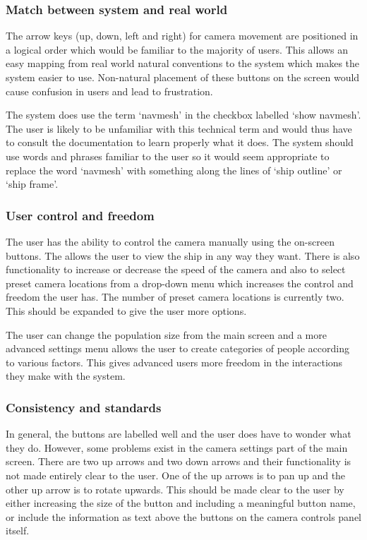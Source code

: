 \subsubsection{Match between system and real world}
The arrow keys (up, down, left and right) for camera movement are positioned in a logical order which would be familiar to the majority of users. This allows an easy mapping from real world natural conventions to the system which makes the system easier to use. Non-natural placement of these buttons on the screen would cause confusion in users and lead to frustration.

The system does use the term ‘navmesh’ in the checkbox labelled ‘show navmesh’. The user is likely to be unfamiliar with this technical term and would thus have to consult the documentation to learn properly what it does. The system should use words and phrases familiar to the user so it would seem appropriate to replace the word ‘navmesh’ with something along the lines of ‘ship outline’ or ‘ship frame’.

\subsubsection{User control and freedom}
The user has the ability to control the camera manually using the on-screen buttons. The allows the user to view the ship in any way they want. There is also functionality to increase or decrease the speed of the camera and also to select preset camera locations from a drop-down menu which increases the control and freedom the user has. The number of preset camera locations is currently two. This should be expanded to give the user more options.

The user can change the population size from the main screen and a more advanced settings menu allows the user to create categories of people according to various factors. This gives advanced users more freedom in the interactions they make with the system.

\subsubsection{Consistency and standards}
In general, the buttons are labelled well and the user does have to wonder what they do. However, some problems exist in the camera settings part of the main screen. There are two up arrows and two down arrows and their functionality is not made entirely clear to the user. One of the up arrows is to pan up and the other up arrow is to rotate upwards. This should be made clear to the user by either increasing the size of the button and including a meaningful button name, or include the information as text above the buttons on the camera controls panel itself.

